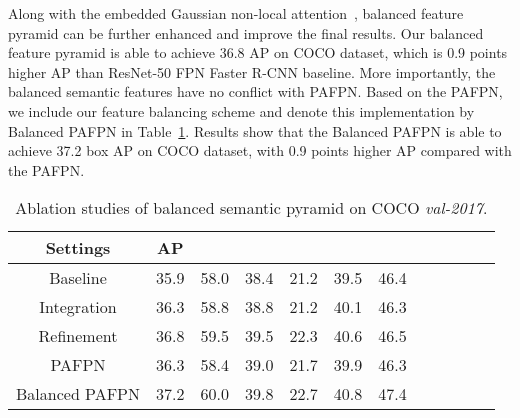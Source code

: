 \documentclass[10pt,twocolumn,letterpaper]{article}
\begin{document}
Along with the embedded Gaussian non-local attention~\cite{nonlocal}, balanced feature pyramid can be further enhanced and improve the final results.
Our balanced feature pyramid is able to achieve 36.8 AP on COCO dataset, which is 0.9 points higher AP than ResNet-50 FPN Faster R-CNN baseline.
More importantly, the balanced semantic features have no conflict with PAFPN.
Based on the PAFPN, we include our feature balancing scheme and denote this implementation by Balanced PAFPN in Table~\ref{tab:fpn}.
Results show that the Balanced PAFPN is able to achieve 37.2 box AP on COCO dataset, with 0.9 points higher AP compared with the PAFPN.

\begin{table}[t]
	\centering
	\caption{Ablation studies of balanced semantic pyramid on COCO \emph{val-2017}.}
	\vspace{-5pt}
	\addtolength{\tabcolsep}{-2pt}
	\begin{tabular}{*{12}{c}}
		\toprule
		Settings          & AP   &  &  &  &  &  \\
		\midrule
		Baseline          & 35.9 & 58.0             & 38.4             & 21.2            & 39.5            & 46.4            \\
		\midrule
		Integration       & 36.3 & 58.8             & 38.8             & 21.2            & 40.1            & 46.3            \\
		Refinement        & 36.8 & 59.5             & 39.5             & 22.3            & 40.6            & 46.5            \\
		\midrule
		PAFPN\cite{panet} & 36.3 & 58.4             & 39.0             & 21.7            & 39.9            & 46.3            \\
		Balanced PAFPN    & 37.2 & 60.0             & 39.8             & 22.7            & 40.8            & 47.4            \\
		\bottomrule
	\end{tabular}
	\vspace{-10pt}
	\label{tab:fpn}
\end{table}
\end{document}
